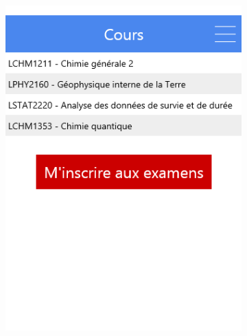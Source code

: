 \documentclass{eplmastersthesis}
\begin{document}
\begin{figure}[H]
\begin{subfigure}[b]{0.3\textwidth}
        \includegraphics[width=\textwidth]{Images/InVision/liste-cours.png}
    \end{subfigure}
\end{figure}
\end{document}

